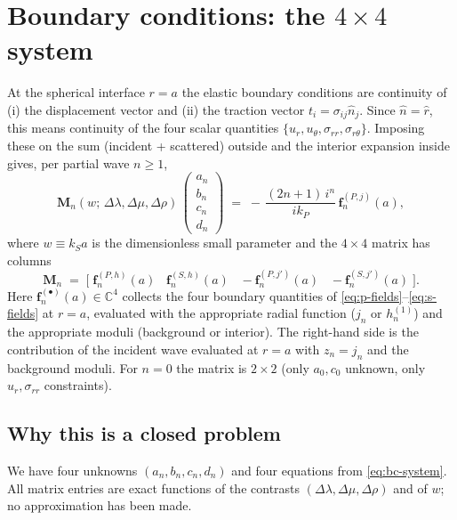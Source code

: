 \documentclass[11pt,a4paper]{article}
\newcommand{\D}{\Delta}
\newcommand{\bM}{\mathbf{M}}
\begin{document}
\section{Boundary conditions: the $4\times 4$ system}
\label{sec:bc}

At the spherical interface $r=a$ the elastic boundary conditions are
continuity of (i) the displacement vector and (ii) the traction vector
$t_i=\sigma_{ij}\hat n_j$.  Since $\hat n=\hat r$, this means
continuity of the four scalar quantities
$\{u_r,u_\theta,\sigma_{rr},\sigma_{r\theta}\}$.  Imposing these on
the sum (incident + scattered) outside and the interior expansion
inside gives, per partial wave $n\ge 1$,
\begin{equation}
\bM_n(w;\,\D\lambda,\D\mu,\D\rho)\,
\begin{pmatrix} a_n \\ b_n \\ c_n \\ d_n \end{pmatrix}
\;=\; -\,\frac{(2n+1)\,i^n}{ik_P}\,\mathbf{f}^{(P,j)}_n(a),
\label{eq:bc-system}
\end{equation}
where $w\equiv k_S a$ is the dimensionless small parameter and the
$4\times 4$ matrix has columns
\begin{equation}
\bM_n \;=\; \bigl[\;\mathbf{f}^{(P,h)}_n(a)\;\;\;\mathbf{f}^{(S,h)}_n(a)\;\;\;
                 -\mathbf{f}^{(P,j')}_n(a)\;\;\;-\mathbf{f}^{(S,j')}_n(a)\;\bigr].
\label{eq:bc-matrix}
\end{equation}
Here $\mathbf{f}^{(\bullet)}_n(a)\in\mathbb{C}^4$ collects the four
boundary quantities of \eqref{eq:p-fields}--\eqref{eq:s-fields} at
$r=a$, evaluated with the appropriate radial function ($j_n$ or
$h_n^{(1)}$) and the appropriate moduli (background or interior).
The right-hand side is the contribution of the incident wave evaluated
at $r=a$ with $z_n=j_n$ and the background moduli.  For $n=0$ the
matrix is $2\times 2$ (only $a_0,c_0$ unknown, only $u_r,\sigma_{rr}$
constraints).

\subsection*{Why this is a closed problem}
We have four unknowns $(a_n,b_n,c_n,d_n)$ and four equations from
\eqref{eq:bc-system}.  All matrix entries are exact functions of the
contrasts $(\D\lambda,\D\mu,\D\rho)$ and of $w$; no approximation has
been made.
\end{document}
